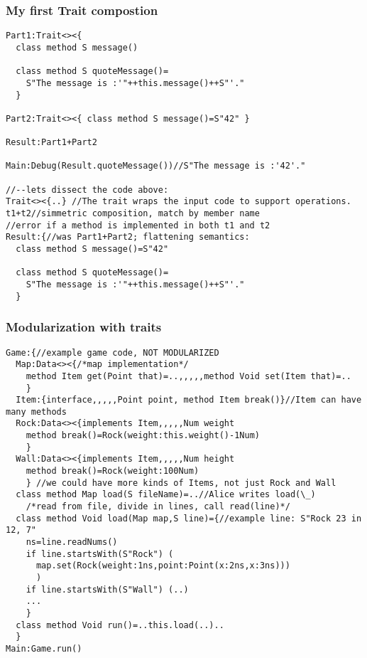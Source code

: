 \begin{frame}[fragile]
\frametitle{My first Trait compostion}
\begin{NiceCode}{59ex}{0.8}
\begin{lstlisting}
Part1:Trait<><{
  class method S message()

  class method S quoteMessage()=
    S"The message is :'"++this.message()++S"'."
  }

Part2:Trait<><{ class method S message()=S"42" }

Result:Part1+Part2

Main:Debug(Result.quoteMessage())//S"The message is :'42'."

//--lets dissect the code above:
Trait<><{..} //The trait wraps the input code to support operations.
t1+t2//simmetric composition, match by member name
//error if a method is implemented in both t1 and t2
Result:{//was Part1+Part2; flattening semantics:
  class method S message()=S"42"

  class method S quoteMessage()=
    S"The message is :'"++this.message()++S"'."
  }
\end{lstlisting}
\end{NiceCode}
\end{frame}


\begin{frame}[fragile]
\frametitle{Modularization with traits}
\begin{NiceCode}{59ex}{0.7}
\begin{lstlisting}
Game:{//example game code, NOT MODULARIZED
  Map:Data<><{/*map implementation*/
    method Item get(Point that)=..,,,,,method Void set(Item that)=..
    }
  Item:{interface,,,,,Point point, method Item break()}//Item can have many methods
  Rock:Data<><{implements Item,,,,,Num weight
    method break()=Rock(weight:this.weight()-1Num)
    }
  Wall:Data<><{implements Item,,,,,Num height
    method break()=Rock(weight:100Num)
    } //we could have more kinds of Items, not just Rock and Wall
  class method Map load(S fileName)=..//Alice writes load(\_)
    /*read from file, divide in lines, call read(line)*/
  class method Void load(Map map,S line)={//example line: S"Rock 23 in 12, 7"
    ns=line.readNums()
    if line.startsWith(S"Rock") (
      map.set(Rock(weight:1ns,point:Point(x:2ns,x:3ns)))
      )
    if line.startsWith(S"Wall") (..)
    ...
    }
  class method Void run()=..this.load(..)..
  }
Main:Game.run()
\end{lstlisting}
\end{NiceCode}
\end{frame}


